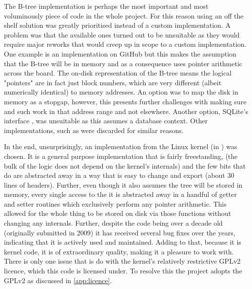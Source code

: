         The B-tree implementation is perhaps the most important and most
        voluminously piece of code in the whole project. For this reason using an
        off the shelf solution was greatly prioritised instead of a custom
        implementation. A problem was that the available ones turned out to be
        unsuitable as they would require major reworks that would creep up in
        scope to a custom implementation. One example is an implementation on
        GitHub \cite{GitHub_btree} but this makes the assumption that the
        B-tree will be in memory and as a consequence uses pointer arithmetic
        across the board. The on-disk representation of the B-tree means the
        logical "pointers" are in fact just block numbers, which are very
        different (albeit numerically identical) to memory addresses. An option
        was to map the disk in memory as a stopgap, however, this presents
        further challenges with making sure  and such work in
        that address range and not elsewhere. Another option, SQLite's
        interface \cite{SQLite_btree}, was unsuitable as this assumes a database
        context. Other implementations, such as \cite{random_btree} were
        discarded for similar reasons.

        In the end, unsurprisingly, an implementation from the Linux kernel (in
         \cite{Linux_source}) was chosen. It is a
        general purpose \bplustree implementation that is fairly freestanding,
        (the bulk of the logic does not depend on the kernel's internals) and
        the few bits that do are abstracted away in a way that is easy to
        change and export (about 30 lines of headers). Further, even though it
        also assumes the tree will be stored in memory, every single access to
        the it is abstracted away in a handful of getter and setter routines
        which exclusively perform any pointer arithmetic. This allowed for the
        whole thing to be stored on disk via those functions without changing
        any internals. Further, despite the code being over a decade old
        (originally submitted in 2009) it has received several bug fixes over
        the years, indicating that it is actively used and maintained. Adding to
        that, because it is kernel code, it is of extraordinary quality, making
        it a pleasure to work with. There is only one issue that is do with the
        kernel's relatively restrictive GPLv2 licence, which this code is
        licensed under. To resolve this the project adopts the GPLv2 as
        discussed in \autoref{app:licence}.

